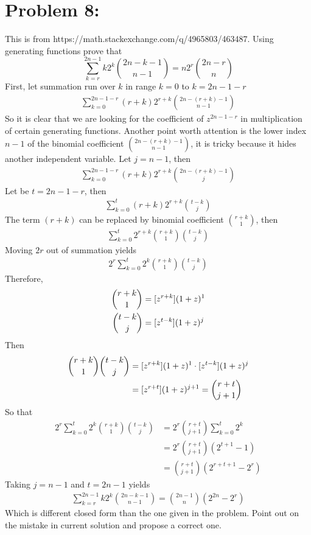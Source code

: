 ﻿\section{Problem 8: }
\label{sec:problem-8}
This is from https://math.stackexchange.com/q/4965803/463487.
Using generating functions prove that
\begin{equation*}
    \sum_{k=r}^{2n-1} k2^k \binom{2n-k-1}{n-1} = n2^r \binom{2n-r}{n}
\end{equation*}
First, let summation run over $k$ in range $k=0$ to $k=2n-1-r$
\begin{align*}
    \sum_{k=0}^{2n-1-r} (r+k) 2^{r+k} \binom{2n-(r+k)-1}{n-1}
\end{align*}
So it is clear that we are looking for the coefficient of $z^{2n-1-r}$ in multiplication of certain generating functions.
Another point worth attention is the lower index $n-1$ of the binomial coefficient $\binom{2n-(r+k)-1}{n-1}$,
it is tricky because it hides another independent variable.
Let $j=n-1$, then
\begin{align*}
    \sum_{k=0}^{2n-1-r} (r+k) 2^{r+k} \binom{2n-(r+k)-1}{j}
\end{align*}
Let be $t=2n-1-r$, then
\begin{align*}
    \sum_{k=0}^{t} (r+k) 2^{r+k} \binom{t-k}{j}
\end{align*}
The term $(r+k)$ can be replaced by binomial coefficient $\binom{r+k}{1}$, then
\begin{align*}
    \sum_{k=0}^{t} 2^{r+k} \binom{r+k}{1} \binom{t-k}{j}
\end{align*}
Moving $2r$ out of summation yields
\begin{align*}
    2^r \sum_{k=0}^{t} 2^{k} \binom{r+k}{1} \binom{t-k}{j}
\end{align*}
Therefore,
\begin{align*}
    \binom{r+k}{1} &= [z^{r+k}] (1+z)^1 \\
    \binom{t-k}{j} &= [z^{t-k}] (1+z)^j
\end{align*}
Then
\begin{align*}
    \binom{r+k}{1} \binom{t-k}{j} &= [z^{r+k}] (1+z)^1 \cdot [z^{t-k}] (1+z)^j \\
    &= [z^{r+t}] (1+z)^{j+1} = \binom{r+t}{j+1}
\end{align*}
So that
\begin{align*}
    2^r \sum_{k=0}^{t} 2^{k} \binom{r+k}{1} \binom{t-k}{j} &= 2^r \binom{r+t}{j+1} \sum_{k=0}^{t} 2^{k} \\
    &= 2^r \binom{r+t}{j+1} (2^{t+1} - 1) \\
    &= \binom{r+t}{j+1} (2^{r+t+1} - 2^r)
\end{align*}
Taking $j=n-1$ and $t=2n-1$ yields
\begin{align*}
    \sum_{k=r}^{2n-1} k2^k \binom{2n-k-1}{n-1} = \binom{2n-1}{n} (2^{2n} - 2^{r})
\end{align*}
Which is different closed form than the one given in the problem.
Point out on the mistake in current solution and propose a correct one.


\clearpage

